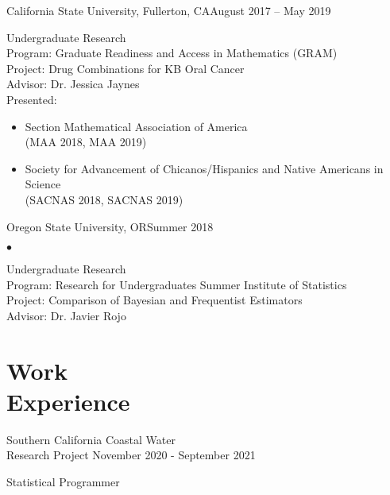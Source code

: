 \documentclass[margin,line]{res}
\newenvironment{list1}{
  \begin{list}{\ding{113}}{
      \setlength{\itemsep}{0in}
      \setlength{\parsep}{0in} \setlength{\parskip}{0in}
      \setlength{\topsep}{0in} \setlength{\partopsep}{0in} 
      \setlength{\leftmargin}{0.20in}}}{\end{list}}
\newenvironment{list2}{
  \begin{list}{$\bullet$}{
      \setlength{\itemsep}{0in}
      \setlength{\parsep}{0in} \setlength{\parskip}{0in}
      \setlength{\topsep}{0in} \setlength{\partopsep}{0in} 
      \setlength{\leftmargin}{0.2in}}}{\end{list}}
\begin{document}
\begin{resume}
{\sc California State University, Fullerton}, CA\hfill{August 2017 -- May 2019}\\
\vspace*{-.15in}
\begin{list1}
\item[] {\sc Undergraduate Research}  \\
\vskip -6pt
Program: Graduate Readiness and Access in Mathematics (GRAM) \\[3pt]
 Project: Drug Combinations for KB Oral Cancer\\[3pt]
 Advisor: Dr. Jessica Jaynes \vspace{0.1cm} \\ 
Presented: 
 \begin{itemize}
 \item Section Mathematical Association of America \\ (MAA 2018, MAA 2019)
 \item Society for Advancement of Chicanos/Hispanics and Native Americans in Science \\ (SACNAS 2018, SACNAS 2019)
 \end{itemize}
\end{list1}
{\sc Oregon State University}, OR\hfill{Summer 2018}\\
\vspace*{-.15in}
\begin{list2}
\item[] {\sc Undergraduate Research}  \\
\vskip -6pt
 Program: Research for Undergraduates Summer Institute of Statistics \\[3pt]
 Project: Comparison of Bayesian and Frequentist Estimators \\[3pt]
Advisor: Dr. Javier Rojo
\end{list2}

\section{\sc Work \\ Experience}
{\sc Southern California Coastal Water\\ Research Project} \hfill {November 2020 - September 2021}\\
\vspace*{-.12in}
\begin{list1}
\itemsep3pt
\item[] Statistical Programmer \\
\vskip -6pt


\end{list1}
\end{resume}
\end{document}
